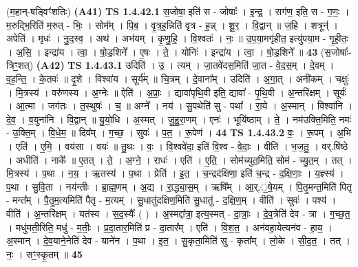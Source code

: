 \documentclass[17pt]{extarticle}
\begin{document}
                  \newline
                       (म॒हान्-षड्विꣳ॑शतिः)  \textbf{(A41)} \newline \newline
                                \textbf{ TS 1.4.42.1} \newline
                  स॒जोषा॒ इति॑ स - जोषाः᳚ । इ॒न्द्र॒ । सग॑ण॒ इति॒ स - ग॒णः॒ । म॒रुद्भि॒रिति॑ म॒रुत् - भिः॒ । सोम᳚म् । पि॒ब॒ । वृ॒त्र॒ह॒न्निति॑ वृत्र - ह॒न्न् । शू॒र॒ । वि॒द्वान् ॥ ज॒हि । शत्रून्॑ । अपेति॑ । मृधः॑ । नु॒द॒स्व॒ । अथ॑ । अभ॑यम् । कृ॒णु॒हि॒ । वि॒श्वतः॑ । नः॒ ॥ उ॒प॒या॒मगृ॑हीत॒ इत्यु॑पया॒म - गृ॒ही॒तः॒ । अ॒सि॒ । इन्द्रा॑य । त्वा॒ । षो॒ड॒शिने᳚ । ए॒षः । ते॒ । योनिः॑ । इन्द्रा॑य । त्वा॒ । षो॒ड॒शिने᳚ ॥ \textbf{  43} \newline
                  \newline
                      (स॒जोषाः᳚-त्रिꣳ॒॒शत्)  \textbf{(A42)} \newline \newline
                                \textbf{ TS 1.4.43.1} \newline
                  उदिति॑ । उ॒ । त्यम् । जा॒तवे॑दस॒मिति॑ जा॒त - वे॒द॒स॒म् । दे॒वम् । व॒ह॒न्ति॒ । के॒तवः॑ ॥ दृ॒शे । विश्वा॑य । सूर्य᳚म् ॥ चि॒त्रम् । दे॒वाना᳚म् । उदिति॑ । अ॒गा॒त् । अनी॑कम् । चक्षुः॑ । मि॒त्रस्य॑ । वरु॑णस्य । अ॒ग्नेः ॥ ऐति॑ । अ॒प्राः॒ । द्यावा॑पृथि॒वी इति॒ द्यावा᳚ - पृ॒थि॒वी । अ॒न्तरि॑क्षम् । सूर्यः॑ । आ॒त्मा । जग॑तः । त॒स्थुषः॑ । च॒ ॥ अग्ने᳚ । नय॑ । सु॒पथेति॑ सु - पथा᳚ । रा॒ये । अ॒स्मान् । विश्वा॑नि । दे॒व॒ । व॒युना॑नि । वि॒द्वान् ॥ यु॒यो॒धि । अ॒स्मत् । जु॒हु॒रा॒णम् । एनः॑ । भूयि॑ष्ठाम् । ते॒ । नम॑उक्ति॒मिति॒ नमः॑ - उ॒क्ति॒म् । वि॒धे॒म॒ ॥ दिव᳚म् । ग॒च्छ॒ । सुवः॑ । प॒त॒ । रू॒पेण॑ । \textbf{  44} \newline
                  \newline
                                \textbf{ TS 1.4.43.2} \newline
                  वः॒ । रू॒पम् । अ॒भि । एति॑ । ए॒मि॒ । वय॑सा । वयः॑ ॥ तु॒थः । वः॒ । वि॒श्ववे॑दा॒ इति॑ वि॒श्व - वे॒दाः॒ । वीति॑ । भ॒ज॒तु॒ । वर्.षि॑ष्ठे । अधीति॑ । नाके᳚ ॥ ए॒तत् । ते॒ । अ॒ग्ने॒ । राधः॑ । एति॑ । ए॒ति॒ । सोम॑च्युत॒मिति॒ सोम॑ - च्यु॒त॒म् । तत् । मि॒त्रस्य॑ । प॒था । न॒य॒ । ऋ॒तस्य॑ । प॒था । प्रेति॑ । इ॒त॒ । च॒न्द्रद॑क्षिणा॒ इति॑ च॒न्द्र - द॒क्षि॒णाः॒ । य॒ज्ञ्स्य॑ । प॒था । सु॒वि॒ता । नय॑न्तीः । ब्रा॒ह्म॒णम् । अ॒द्य । रा॒द्ध्या॒स॒म् । ऋषि᳚म् । आ॒र्.॒षे॒यम् । पि॒तृ॒मन्त॒मिति॑ पितृ - मन्त᳚म् । पै॒तृ॒म॒त्यमिति॑ पैतृ - म॒त्यम् । सु॒धातु॑दक्षिण॒मिति॑ सु॒धातु॑ - द॒क्षि॒ण॒म् । वीति॑ । सुवः॑ । पश्य॑ । वीति॑ । अ॒न्तरि॑क्षम् । यत॑स्व । स॒द॒स्यैः᳚ ( ) । अ॒स्मद्दा᳚त्रा॒ इत्य॒स्मत् - दा॒त्राः॒ । दे॒व॒त्रेति॑ देव - त्रा । ग॒च्छ॒त॒ । मधु॑मती॒रिति॒ मधु॑ - म॒तीः॒ । प्र॒दा॒तार॒मिति॑ प्र - दा॒तार᳚म् । एति॑ । वि॒श॒त॒ । अन॑वहा॒येत्यन॑व - हा॒य॒ । अ॒स्मान् । दे॒व॒याने॒नेति॑ देव - याने॑न । प॒था । इ॒त॒ । सु॒कृता॒मिति॑ सु - कृता᳚म् । लो॒के । सी॒द॒त॒ । तत् । नः॒ । सꣳ॒॒स्कृ॒तम् ॥ \textbf{  45 } \newline
\end{document}
